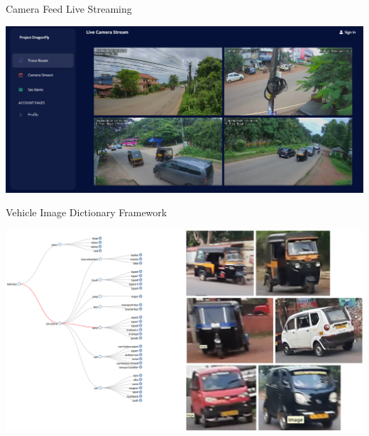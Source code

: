 \documentclass{beamer}
\begin{document}
	\begin{frame}{Camera Feed Live Streaming}
		\begin{center}
			\includegraphics[width=\linewidth]{res/live_stream.png}
		\end{center}
	\end{frame}

	\begin{frame}{Vehicle Image Dictionary Framework}
		\begin{center}
			\includegraphics[width=\linewidth]{res/image_dictionary.png}
		\end{center}
	\end{frame}
\end{document}
